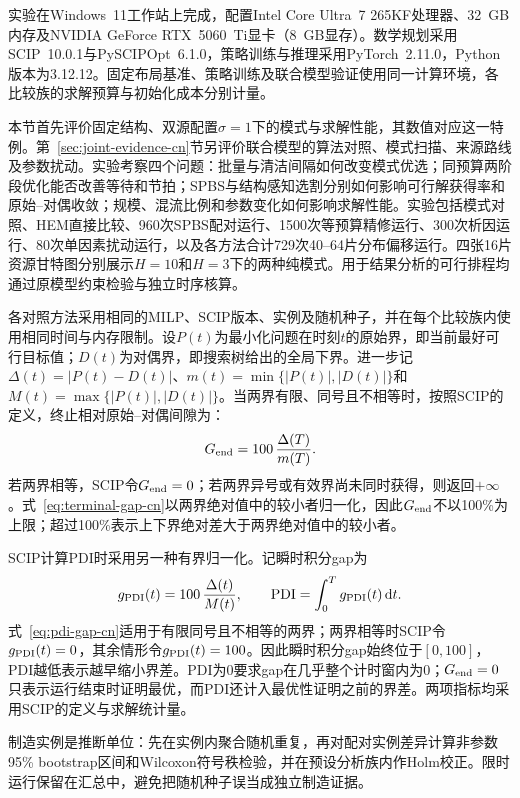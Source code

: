 \documentclass[final,5p,times,twocolumn]{elsarticle}
\newcommand{\pdi}{\mathrm{PDI}}
\begin{document}
实验在Windows~11工作站上完成，配置Intel Core Ultra~7 265KF处理器、32~GB内存及NVIDIA GeForce RTX~5060~Ti显卡（8~GB显存）。数学规划采用SCIP~10.0.1与PySCIPOpt~6.1.0，策略训练与推理采用PyTorch~2.11.0，Python版本为3.12.12。固定布局基准、策略训练及联合模型验证使用同一计算环境，各比较族的求解预算与初始化成本分别计量。

本节首先评价固定结构、双源配置$\sigma=1$下的模式与求解性能，其数值对应这一特例。第~\ref{sec:joint-evidence-cn}节另评价联合模型的算法对照、模式扫描、来源路线及参数扰动。实验考察四个问题：批量与清洁间隔如何改变模式优选；同预算两阶段优化能否改善等待和节拍；SPBS与结构感知选割分别如何影响可行解获得率和原始--对偶收敛；规模、混流比例和参数变化如何影响求解性能。实验包括模式对照、HEM直接比较、960次SPBS配对运行、1500次等预算精修运行、300次析因运行、80次单因素扰动运行，以及各方法合计729次40--64片分布偏移运行。四张16片资源甘特图分别展示$H=10$和$H=3$下的两种纯模式。用于结果分析的可行排程均通过原模型约束检验与独立时序核算。

各对照方法采用相同的MILP、SCIP版本、实例及随机种子，并在每个比较族内使用相同时间与内存限制。设$P(t)$为最小化问题在时刻$t$的原始界，即当前最好可行目标值；$D(t)$为对偶界，即搜索树给出的全局下界。进一步记$\Delta(t)=|P(t)-D(t)|$、$m(t)=\min\{|P(t)|,|D(t)|\}$和$M(t)=\max\{|P(t)|,|D(t)|\}$。当两界有限、同号且不相等时，按照SCIP的定义，终止相对原始--对偶间隙为：
\begin{equation}
G_{\rm end}=100\,\frac{\Delta(T)}{m(T)}.
\label{eq:terminal-gap-cn}
\end{equation}
若两界相等，SCIP令$G_{\rm end}=0$；若两界异号或有效界尚未同时获得，则返回$+\infty$。式~\eqref{eq:terminal-gap-cn}以两界绝对值中的较小者归一化，因此$G_{\rm end}$不以100\%为上限；超过100\%表示上下界绝对差大于两界绝对值中的较小者。

SCIP计算PDI时采用另一种有界归一化。记瞬时积分gap为
\begin{equation}
g_{\rm PDI}(t)=100\,\frac{\Delta(t)}{M(t)},\qquad
\pdi=\int_0^T g_{\rm PDI}(t)\,\mathrm dt.
\label{eq:pdi-gap-cn}
\end{equation}
式~\eqref{eq:pdi-gap-cn}适用于有限同号且不相等的两界；两界相等时SCIP令$g_{\rm PDI}(t)=0$，其余情形令$g_{\rm PDI}(t)=100$。因此瞬时积分gap始终位于$[0,100]$，PDI越低表示越早缩小界差。PDI为0要求gap在几乎整个计时窗内为0；$G_{\rm end}=0$只表示运行结束时证明最优，而PDI还计入最优性证明之前的界差。两项指标均采用SCIP的定义与求解统计量\citep{achterberg2009scip,bestuzheva2023scip}。

制造实例是推断单位：先在实例内聚合随机重复，再对配对实例差异计算非参数95\% bootstrap区间和Wilcoxon符号秩检验，并在预设分析族内作Holm校正。限时运行保留在汇总中，避免把随机种子误当成独立制造证据。
\end{document}
